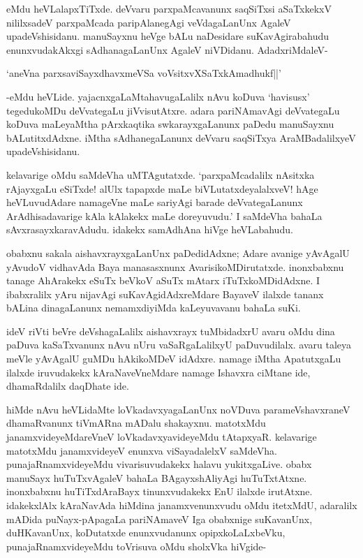 eMdu heVLalapxTiTxde. deVvaru parxpaMcavanunx saqSiTxsi aSaTxkekxV nililxsadeV parxpaMcada paripAlanegAgi veVdagaLanUnx AgaleV upadeVshisidanu. manuSayxnu heVge bALu naDesidare suKavAgirabahudu enunxvudakAkxgi sAdhanagaLanUnx AgaleV niVDidanu. AdadxriMdaleV-

\begin{shloka}
`aneVna parxsaviSayxdhavxmeVSa voV\s sitxvXSaTxkAmadhukf||'
\end{shloka}

-eMdu heVLide. yajacnxgaLaMtahavugaLalilx nAvu koDuva `havisusx' tegedukoMDu deVvategaLu jiVvisutAtxre. adara pariNAmavAgi deVvategaLu koDuva maLeyaMtha pArxkaqtika swkarayxgaLanunx paDedu manuSayxnu bALutitxdAdxne. iMtha sAdhanegaLanunx deVvaru saqSiTxya AraMBadalilxyeV upadeVshisidanu.

kelavarige oMdu saMdeVha uMTAgutatxde. `parxpaMcadalilx nAsitxka rAjayxgaLu eSiTxde! alUlx tapapxde maLe biVLutatxdeyalalxveV! hAge heVLuvudAdare namageVne maLe sariyAgi barade deVvategaLanunx ArAdhisadavarige kAla kAlakekx maLe doreyuvudu.' I saMdeVha bahaLa sAvxrasayxkaravAdudu. idakekx samAdhAna hiVge heVLabahudu.

obabxnu sakala aishavxrayxgaLanUnx paDedidAdxne; Adare avanige yAvAgalU yAvudoV vidhavAda Baya manasasxnunx AvarisikoMDirutatxde. inonxbabxnu tanage AhArakekx eSuTx beVkoV aSuTx mAtarx iTuTxkoMDidAdxne. I ibabxralilx yAru nijavAgi suKavAgidAdxreMdare BayaveV ilalxde tananx bALina dinagaLanunx nemamxdiyiMda kaLeyuvavanu bahaLa suKi.

ideV riVti beVre deVshagaLalilx aishavxrayx tuMbidadxrU avaru oMdu dina paDuva kaSaTxvanunx nAvu nUru vaSaRgaLalilxyU paDuvudilalx. avaru taleya meVle yAvAgalU guMDu hAkikoMDeV idAdxre. namage iMtha ApatutxgaLu ilalxde iruvudakekx kAraNaveVneMdare namage Ishavxra ciMtane ide, dhamaRdalilx daqDhate ide.

hiMde nAvu heVLidaMte loVkadavxyagaLanUnx noVDuva parameVshavxraneV dhamaRvanunx tiVmARna mADalu shakayxnu. matotxMdu janamxvideyeMdareVneV loVkadavxyavideyeMdu tAtapxyaR. kelavarige matotxMdu janamxvideyeV enunxva viSayadalelxV saMdeVha. punajaRnamxvideyeMdu vivarisuvudakekx halavu yukitxgaLive. obabx manuSayx huTuTxvAgaleV bahaLa BAgayxshAliyAgi huTuTxtAtxne. inonxbabxnu huTiTxdAraBayx tinunxvudakekx EnU ilalxde irutAtxne. idakekxlAlx kAraNavAda hiMdina janamxvenunxvudu oMdu itetxMdU, adaralilx mADida puNayx-pApagaLa pariNAmaveV Iga obabxnige suKavanUnx, duHKavanUnx, koDutatxde enunxvudanunx opipxkoLaLxbeVku, punajaRnamxvideyeMdu toVrisuva oMdu sholxVka hiVgide-

